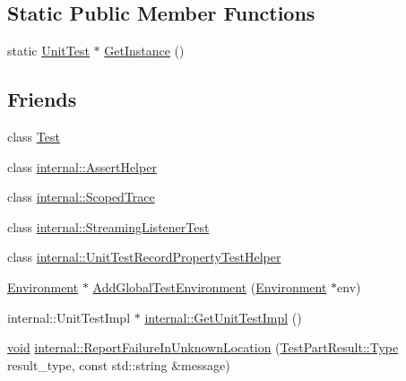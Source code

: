 \subsection*{Static Public Member Functions}
\begin{DoxyCompactItemize}
\item 
static \hyperlink{classtesting_1_1UnitTest}{Unit\-Test} $\ast$ \hyperlink{classtesting_1_1UnitTest_af254e2e695471eb9f128bc556bae3668}{Get\-Instance} ()
\end{DoxyCompactItemize}
\subsection*{Friends}
\begin{DoxyCompactItemize}
\item 
class \hyperlink{classtesting_1_1UnitTest_a5b78b1c2e1fa07ffed92da365593eaa4}{Test}
\item 
class \hyperlink{classtesting_1_1UnitTest_a183151aa061362c87572e743fe233db1}{internal\-::\-Assert\-Helper}
\item 
class \hyperlink{classtesting_1_1UnitTest_afa3927576c08d7b1e197ba16b2b3dcb7}{internal\-::\-Scoped\-Trace}
\item 
class \hyperlink{classtesting_1_1UnitTest_adc037d188dab349a94868991955c9cd4}{internal\-::\-Streaming\-Listener\-Test}
\item 
class \hyperlink{classtesting_1_1UnitTest_ae970f89a9f477a349fe5778be85ef42e}{internal\-::\-Unit\-Test\-Record\-Property\-Test\-Helper}
\item 
\hyperlink{classtesting_1_1Environment}{Environment} $\ast$ \hyperlink{classtesting_1_1UnitTest_a5ec26e4c31220ff8e769cc09689a4d6d}{Add\-Global\-Test\-Environment} (\hyperlink{classtesting_1_1Environment}{Environment} $\ast$env)
\item 
internal\-::\-Unit\-Test\-Impl $\ast$ \hyperlink{classtesting_1_1UnitTest_a56e56be7066957d612e53b5c60f6ac08}{internal\-::\-Get\-Unit\-Test\-Impl} ()
\item 
\hyperlink{legacy_8hpp_a8bb47f092d473522721002c86c13b94e}{void} \hyperlink{classtesting_1_1UnitTest_a73f5a158c13793b90c80d854c9a75120}{internal\-::\-Report\-Failure\-In\-Unknown\-Location} (\hyperlink{classtesting_1_1TestPartResult_a65ae656b33fdfdfffaf34858778a52d5}{Test\-Part\-Result\-::\-Type} result\-\_\-type, const std\-::string \&message)
\end{DoxyCompactItemize}


